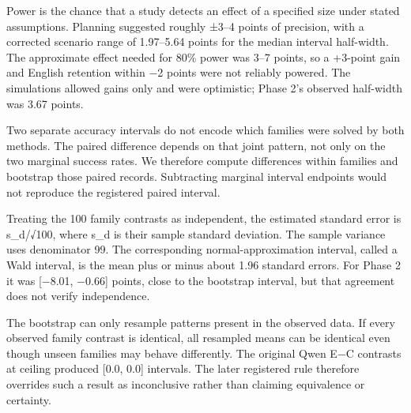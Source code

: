 Power is the chance that a study detects an effect of a specified size under stated assumptions. Planning suggested roughly ±3–4 points of precision, with a corrected scenario range of 1.97–5.64 points for the median interval half-width. The approximate effect needed for 80\% power was 3–7 points, so a +3-point gain and English retention within −2 points were not reliably powered. The simulations allowed gains only and were optimistic; Phase 2's observed half-width was 3.67 points.

\medskip{}\par\nopagebreak

Two separate accuracy intervals do not encode which families were solved by both methods. The paired difference depends on that joint pattern, not only on the two marginal success rates. We therefore compute differences within families and bootstrap those paired records. Subtracting marginal interval endpoints would not reproduce the registered paired interval.

\medskip{}\par\nopagebreak

Treating the 100 family contrasts as independent, the estimated standard error is s\_d/√100, where s\_d is their sample standard deviation. The sample variance uses denominator 99. The corresponding normal-approximation interval, called a Wald interval, is the mean plus or minus about 1.96 standard errors. For Phase 2 it was [−8.01, −0.66] points, close to the bootstrap interval, but that agreement does not verify independence.

\medskip{}\par\nopagebreak

The bootstrap can only resample patterns present in the observed data. If every observed family contrast is identical, all resampled means can be identical even though unseen families may behave differently. The original Qwen E−C contrasts at ceiling produced [0.0, 0.0] intervals. The later registered rule therefore overrides such a result as inconclusive rather than claiming equivalence or certainty.

\medskip{}\par\nopagebreak

